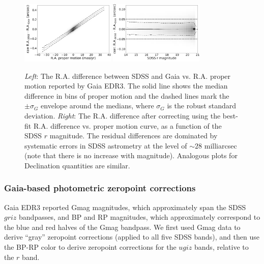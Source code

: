 \documentclass[fleqn,usenatbib]{mnras}
\begin{document}
\begin{figure}
\centering \includegraphics[width=0.4\textwidth, keepaspectratio]{figures/astroVSpm_RA_pm.png}
\centering \includegraphics[width=0.4\textwidth, keepaspectratio]{figures/astroVSpm_RA_r.png}

\caption{{\it Left}: The R.A. difference between SDSS and Gaia 
vs. R.A. proper motion reported by Gaia EDR3. The solid line shows the median difference in bins 
of proper motion and the dashed lines mark the $\pm \sigma_G$ envelope around the medians,
where $\sigma_G$ is the robust standard deviation. {\it Right}: The R.A. difference 
after correcting using the best-fit R.A. difference vs. 
proper motion curve, as a function of the SDSS $r$ magnitude. The residual differences are dominated 
by systematic errors in SDSS astrometry at the level of $\sim28$ milliarcsec (note that there is no increase with 
magnitude). Analogous plots for Declination quantities are similar. 
\label{fig:GaiaRApm}}
\end{figure}


\subsubsection{Gaia-based photometric zeropoint corrections  \label{sec:GaiaCorr2}}

Gaia EDR3 reported Gmag magnitudes, which approximately span the SDSS $griz$ bandpasses, 
and BP and RP magnitudes, which approximately correspond to the blue and red halves of the 
Gmag bandpass. We first used Gmag data to derive ``gray'' zeropoint corrections (applied to
all five SDSS bands), and then use the BP-RP color to derive zeropoint corrections for the 
$ugiz$ bands, relative to the $r$ band. 
\end{document}
